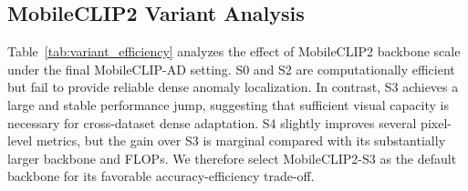 \documentclass[10pt]{article}
\begin{document}
\begin{table}[htbp]
\centering
\caption{Sensitivity analysis on the object-agnostic prototype anchor weight $\lambda_{\mathrm{anchor}}$ under the VisA $\rightarrow$ MVTec AD setting. Metrics are reported in percentage as mean $\pm$ standard deviation over three seeds. Image-level metrics are computed using score-mean aggregation.}
\label{tab:anchor_ablation}
\renewcommand{\arraystretch}{1.08}
\scriptsize
{}
\end{table}


\subsection{MobileCLIP2 Variant Analysis}

Table~\ref{tab:variant_efficiency} analyzes the effect of MobileCLIP2 backbone scale under the final MobileCLIP-AD setting. S0 and S2 are computationally efficient but fail to provide reliable dense anomaly localization. In contrast, S3 achieves a large and stable performance jump, suggesting that sufficient visual capacity is necessary for cross-dataset dense adaptation. S4 slightly improves several pixel-level metrics, but the gain over S3 is marginal compared with its substantially larger backbone and FLOPs. We therefore select MobileCLIP2-S3 as the default backbone for its favorable accuracy-efficiency trade-off.
\end{document}
